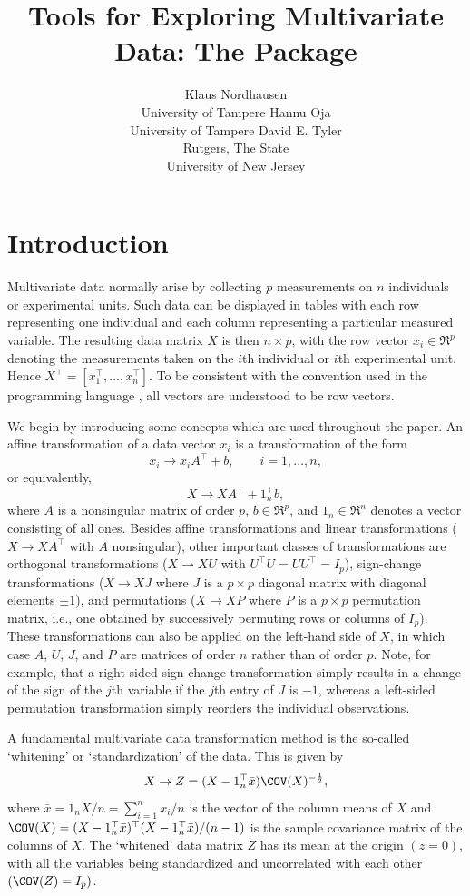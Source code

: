 \documentclass[article,nojss]{jss}
\author{Klaus Nordhausen\\ University of Tampere \And
        Hannu Oja\\ University of Tampere \And
        David E. Tyler\\Rutgers, The State\\University of New Jersey}
\title{Tools for Exploring Multivariate Data: The Package \pkg{ICS}}
\begin{document}
\section{Introduction}

Multivariate data normally arise by collecting $p$ measurements on
$n$ individuals or experimental units. Such data can be displayed in
tables with each row representing one individual and each column
representing a particular measured variable. The resulting data
matrix $X$ is then $n \times p$, with the row vector $x_i \in \Re^p$
denoting the measurements taken on the $i$th individual or $i$th
experimental unit. Hence $X^\top = [ x_1^\top, \ldots, x_n^\top ]$. To be
consistent with the convention used in the programming language
, all vectors are understood to be row vectors.

We begin by introducing some concepts which are used throughout the paper.
An affine transformation of a data vector $x_i$ is a transformation of the form
\[
x_i \rightarrow x_iA^\top +b,\qquad i=1,\ldots,n,
\]
or equivalently,
\[
X \rightarrow XA^\top +1_n^\top b,
\]
where $A$ is a nonsingular matrix of order $p$, $b \in \Re^p$, and
$1_n \in \Re^n$ denotes a vector consisting of all ones. Besides affine transformations and
linear transformations ($X \rightarrow XA^\top$ with $A$
nonsingular), other important classes of transformations are
orthogonal transformations ($X \rightarrow XU$ with $U^\top U=UU^\top =I_p$),
sign-change transformations ($X \rightarrow XJ$ where $J$ is a $p
\times p$ diagonal matrix with diagonal elements $\pm 1$), and
permutations ($X \rightarrow XP$ where $P$ is a $p \times p$
permutation matrix, i.e., one obtained by successively permuting
rows or columns of $I_p$). These transformations can also be applied
on the left-hand side of $X$, in which case $A$, $U$, $J$, and $P$
are matrices of order $n$ rather than of order $p$. Note, for
example,  that a right-sided sign-change transformation simply
results in a change of the sign of the $j$th variable if the $j$th
entry of $J$ is $-1$, whereas a left-sided permutation
transformation simply reorders the individual observations.

A fundamental multivariate data transformation method is the so-called `whitening' or `standardization'
of the data. This is given by
\[
X \rightarrow Z=(X-1_n^\top \bar{x})\COV(X)^{-\frac{1}{2}},
\]
where $\bar{x}= 1_nX/n = \sum_{i=1}^n x_i/n$ is the vector of the
column means of $X$ and $\COV(X)=
(X-1_n^\top \bar{x})^\top (X-1_n^\top \bar{x})/(n-1)$ is the sample covariance
matrix of the columns of $X$. The `whitened' data matrix $Z$ has its
mean at the origin $(\bar{z}=0)$, with all the variables being
standardized and uncorrelated with each other $(\COV(Z)=I_p)$.
\end{document}
